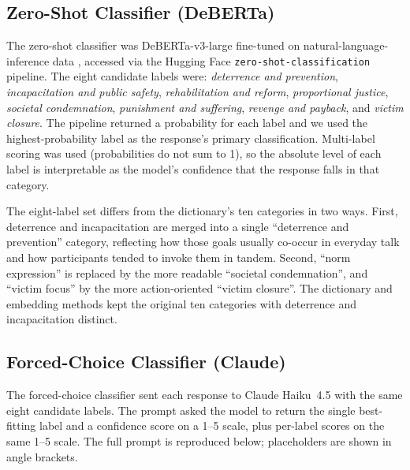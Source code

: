 \subsection{Zero-Shot Classifier (DeBERTa)}

The zero-shot classifier was DeBERTa-v3-large fine-tuned on natural-language-inference data \citep{he2023deberta}, accessed via the Hugging Face \texttt{zero-shot-classification} pipeline. The eight candidate labels were: \textit{deterrence and prevention}, \textit{incapacitation and public safety}, \textit{rehabilitation and reform}, \textit{proportional justice}, \textit{societal condemnation}, \textit{punishment and suffering}, \textit{revenge and payback}, and \textit{victim closure}. The pipeline returned a probability for each label and we used the highest-probability label as the response's primary classification. Multi-label scoring was used (probabilities do not sum to 1), so the absolute level of each label is interpretable as the model's confidence that the response falls in that category.

The eight-label set differs from the dictionary's ten categories in two ways. First, deterrence and incapacitation are merged into a single ``deterrence and prevention'' category, reflecting how those goals usually co-occur in everyday talk and how participants tended to invoke them in tandem. Second, ``norm expression'' is replaced by the more readable ``societal condemnation'', and ``victim focus'' by the more action-oriented ``victim closure''. The dictionary and embedding methods kept the original ten categories with deterrence and incapacitation distinct.

\subsection{Forced-Choice Classifier (Claude)}

The forced-choice classifier sent each response to Claude Haiku~4.5 \citep{anthropicclaude2024} with the same eight candidate labels. The prompt asked the model to return the single best-fitting label and a confidence score on a 1--5 scale, plus per-label scores on the same 1--5 scale. The full prompt is reproduced below; placeholders are shown in angle brackets.

